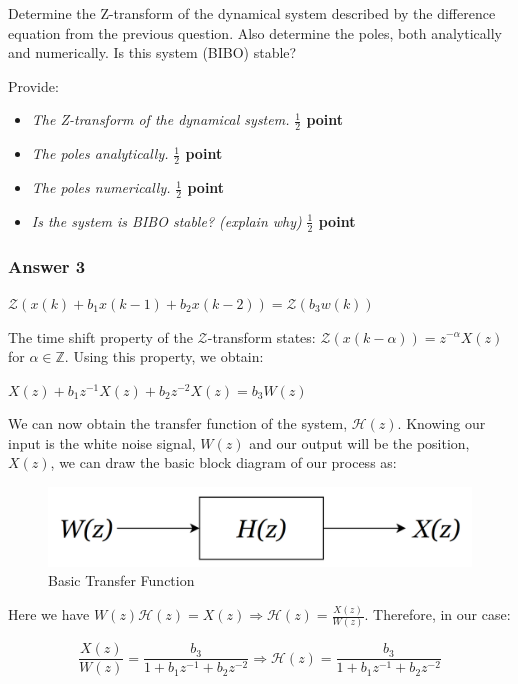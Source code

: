 \documentclass[11pt]{article}
\providecommand{\tightlist}{%
      \setlength{\itemsep}{0pt}\setlength{\parskip}{0pt}}
\begin{document}
Determine the Z-transform of the dynamical system described by the
difference equation from the previous question. Also determine the
poles, both analytically and numerically. Is this system (BIBO) stable?

Provide:

\begin{itemize}
\tightlist
\item
  \emph{The Z-transform of the dynamical system.}
  \textbf{\(\frac{1}{2}\) point}
\item
  \emph{The poles analytically.} \textbf{\(\frac{1}{2}\) point}
\item
  \emph{The poles numerically.} \textbf{\(\frac{1}{2}\) point}
\item
  \emph{Is the system is BIBO stable? (explain why)}
  \textbf{\(\frac{1}{2}\) point}
\end{itemize}

    \hypertarget{answer-3}{%
\subsubsection{Answer 3}\label{answer-3}}

\(\mathcal{Z}(x(k) + b_1 x(k-1) + b_2 x(k-2)) = \mathcal{Z}(b_3 w(k))\)

The time shift property of the \(\mathcal{Z}\)-transform states:
\(\mathcal{Z}(x(k-\alpha)) = z^{-\alpha}X(z)\) for
\(\alpha \in \mathbb{Z}\). Using this property, we obtain:

\(X(z) + b_1 z^{-1} X(z) + b_2 z^{-2} X(z) = b_3 W(z)\)

We can now obtain the transfer function of the system,
\(\mathcal{H}(z)\). Knowing our input is the white noise signal,
\(W(z)\) and our output will be the position, \(X(z)\), we can draw the
basic block diagram of our process as:

\begin{figure}
\centering
\includegraphics{BasicTF.png}
\caption{Basic Transfer Function}
\end{figure}

Here we have
\(W(z)\mathcal{H}(z) = X(z) \Rightarrow \mathcal{H}(z) = \frac{X(z)}{W(z)}\).
Therefore, in our case:

\[\frac{X(z)}{W(z)} = \frac{b_3}{1 + b_1 z^{-1} + b_2 z^{-2}} \Rightarrow  \mathcal{H}(z) = \frac{b_3}{1 + b_1 z^{-1} + b_2 z^{-2}}\]
\end{document}
